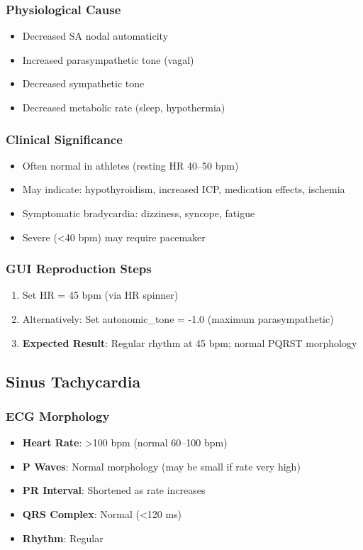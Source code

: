 \documentclass[11pt, a4paper]{article}
\begin{document}
\subsubsection{Physiological Cause}
\begin{itemize}
    \item Decreased SA nodal automaticity
    \item Increased parasympathetic tone (vagal)
    \item Decreased sympathetic tone
    \item Decreased metabolic rate (sleep, hypothermia)
\end{itemize}

\subsubsection{Clinical Significance}
\begin{itemize}
    \item Often normal in athletes (resting HR 40--50 bpm)
    \item May indicate: hypothyroidism, increased ICP, medication effects, ischemia
    \item Symptomatic bradycardia: dizziness, syncope, fatigue
    \item Severe (<40 bpm) may require pacemaker
\end{itemize}

\subsubsection{GUI Reproduction Steps}
\begin{enumerate}
    \item Set HR = 45 bpm (via HR spinner)
    \item Alternatively: Set autonomic\_tone = -1.0 (maximum parasympathetic)
    \item \textbf{Expected Result}: Regular rhythm at 45 bpm; normal PQRST morphology
\end{enumerate}

\subsection{Sinus Tachycardia}

\subsubsection{ECG Morphology}
\begin{itemize}
    \item \textbf{Heart Rate}: >100 bpm (normal 60--100 bpm)
    \item \textbf{P Waves}: Normal morphology (may be small if rate very high)
    \item \textbf{PR Interval}: Shortened as rate increases
    \item \textbf{QRS Complex}: Normal (<120 ms)
    \item \textbf{Rhythm}: Regular
\end{itemize}
\end{document}
